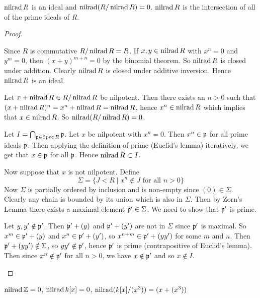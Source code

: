 \begin{prop}[0.12]
  	\leavevmode
	\begin{enum}
		\io $\operatorname{nilrad} R$ is an ideal and $\operatorname{nilrad}(R/\operatorname{nilrad} R)=0$.
		\io $\operatorname{nilrad} R$ is the intersection of all of the prime ideals of $R$.
	\end{enum}
\end{prop}

\begin{proof}
  	\leavevmode
	\begin{enum}
		\io Since $R$ is commutative $R/\operatorname{nilrad} R = R$.
		If $x,y \in \operatorname{nilrad} R$ with $x^n=0$ and $y^m=0$, then $(x+y)^{m+n}=0$ by the binomial theorem.
		So $\operatorname{nilrad} R$ is closed under addition.
		Clearly $\operatorname{nilrad} R$ is closed under additive inversion.
		Hence $\operatorname{nilrad} R$ is an ideal.
		
		Let $x+\operatorname{nilrad} R \in R/\operatorname{nilrad} R$ be nilpotent.
		Then there exists an $n > 0$ such that $(x+\operatorname{nilrad} R)^n = x^n + \operatorname{nilrad} R = \operatorname{nilrad} R$, hence $x^n \in \operatorname{nilrad} R$ which implies that $x \in \operatorname{nilrad} R$.
		So $\operatorname{nilrad}(R/\operatorname{nilrad} R)=0$.
		
		\io Let $I = \bigcap_{\mathfrak{p} \in \operatorname{Spec} R} \mathfrak{p}$.
		Let $x$ be nilpotent with $x^n=0$.
		Then $x^n \in \mathfrak{p}$ for all prime ideals $\mathfrak{p}$.
		Then applying the definition of prime (Euclid's lemma) iteratively, we get that $x \in \mathfrak{p}$ for all $\mathfrak{p}$.
		Hence $\operatorname{nilrad} R \subset I$.
		
		Now suppose that $x$ is not nilpotent.
		Define
		\[\Sigma = \{J<R \mid x^n \notin J \text{ for all } n>0\}\]
		Now $\Sigma$ is partially ordered by inclusion and is non-empty since $(0) \in \Sigma$.
		Clearly any chain is bounded by its union which is also in $\Sigma$.
		Then by Zorn's Lemma there exists a maximal element $\mathfrak{p}' \in \Sigma$.
		We need to show that $\mathfrak{p}'$ is prime.
		
		Let $y,y' \notin \mathfrak{p}'$.
		Then $\mathfrak{p}'+(y)$ and $\mathfrak{p}'+(y')$ are not in $\Sigma$ since $\mathfrak{p}'$ is maximal.
		So $x^m \in \mathfrak{p}'+(y)$ and $x^n \in \mathfrak{p}' + (y')$, so $x^{n+m} \in \mathfrak{p}' + (yy')$ for some $m$ and $n$.
		Then $\mathfrak{p}' + (yy') \notin \Sigma$, so $yy' \notin \mathfrak{p}'$, hence $\mathfrak{p}'$ is prime (contrapositive of Euclid's lemma).
		Then since $x^n \notin \mathfrak{p}'$ for all $n>0$, we have $x \notin \mathfrak{p}'$ and so $x \notin I$.
		\qedhere
	\end{enum}
\end{proof}

\begin{exam}
	$\operatorname{nilrad} \mathbb{Z} = 0$, $\operatorname{nilrad} k[x] = 0$, $\operatorname{nilrad}(k[x]/(x^3))=(x+(x^3))$
\end{exam}


